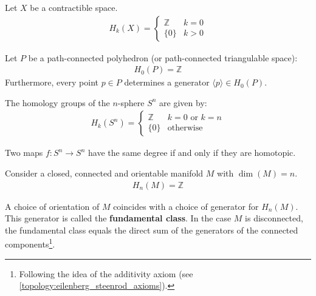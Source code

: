 	\begin{example}
		Let $X$ be a contractible space.
		\begin{gather}
			H_k(X) = \begin{cases}
				\mathbb{Z}&k=0\\
				\{0\}&k>0
			\end{cases}
		\end{gather}
	\end{example}
	\begin{example}
		Let $P$ be a path-connected polyhedron (or path-connected triangulable space):
		\begin{gather}
			H_0(P) = \mathbb{Z}
		\end{gather}
		Furthermore, every point $p\in P$ determines a generator $\langle p \rangle\in H_0(P)$.
	\end{example}
	\begin{example}
		The homology groups of the $n$-sphere $S^n$ are given by:
		\begin{gather}
			H_k(S^n)=\begin{cases}
				\mathbb{Z}&k=0\text{ or }k=n\\
				\{0\}&\text{otherwise}
			\end{cases}
		\end{gather}
	\end{example}
	\begin{property}
		Two maps $f:S^n\rightarrow S^n$ have the same degree if and only if they are homotopic.
	\end{property}

	\begin{example}
		Consider a closed, connected and orientable manifold $M$ with $\dim(M) = n$.
		\begin{gather}
			H_n(M) = \mathbb{Z}
		\end{gather}
	\end{example}
	\begin{result}[Orientation]
		A choice of orientation of $M$ coincides with a choice of generator for $H_n(M)$. This generator is called the \textbf{fundamental class}. In the case $M$ is disconnected, the fundamental class equals the direct sum of the generators of the connected components\footnote{Following the idea of the additivity axiom (see \ref{topology:eilenberg_steenrod_axioms}).}.
	\end{result}

